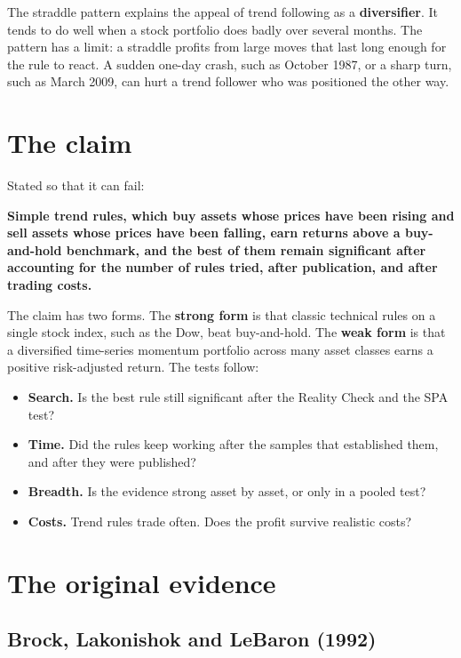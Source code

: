 The straddle pattern explains the appeal of trend following as a \textbf{diversifier}. It tends to do well when a stock portfolio does badly over several months. The pattern has a limit: a straddle profits from large moves that last long enough for the rule to react. A sudden one-day crash, such as October 1987, or a sharp turn, such as March 2009, can hurt a trend follower who was positioned the other way.

\section{The claim}
\label{sec:09-claim}

Stated so that it can fail:

\begin{callout}
\textbf{Simple trend rules, which buy assets whose prices have been rising and sell assets whose prices have been falling, earn returns above a buy-and-hold benchmark, and the best of them remain significant after accounting for the number of rules tried, after publication, and after trading costs.}
\end{callout}

The claim has two forms. The \textbf{strong form} is that classic technical rules on a single stock index, such as the Dow, beat buy-and-hold. The \textbf{weak form} is that a diversified time-series momentum portfolio across many asset classes earns a positive risk-adjusted return. The tests follow:

\begin{itemize}
  \item \textbf{Search.} Is the best rule still significant after the Reality Check and the SPA test?
  \item \textbf{Time.} Did the rules keep working after the samples that established them, and after they were published?
  \item \textbf{Breadth.} Is the evidence strong asset by asset, or only in a pooled test?
  \item \textbf{Costs.} Trend rules trade often. Does the profit survive realistic costs?
\end{itemize}

\section{The original evidence}
\label{sec:09-evidence}

\subsection{Brock, Lakonishok and LeBaron (1992)}

